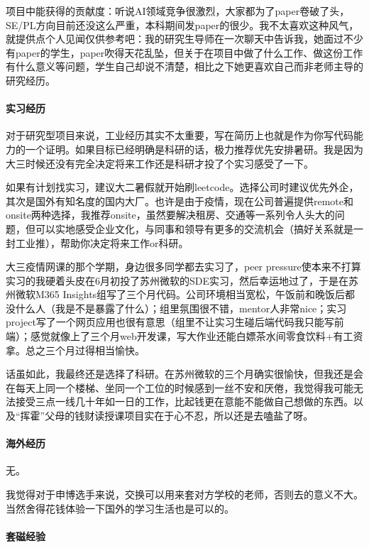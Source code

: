 项目中能获得的贡献度：听说AI领域竞争很激烈，大家都为了paper卷破了头，SE/PL方向目前还没这么严重，本科期间发paper的很少。我不太喜欢这种风气，就提供点个人见闻仅供参考吧：我的研究生导师在一次聊天中告诉我，她面过不少有paper的学生，paper吹得天花乱坠，但关于在项目中做了什么工作、做这份工作有什么意义等问题，学生自己却说不清楚，相比之下她更喜欢自己而非老师主导的研究经历。

\paragraph{实习经历}

对于研究型项目来说，工业经历其实不太重要，写在简历上也就是作为你写代码能力的一个证明。如果目标已经明确是科研的话，极力推荐优先安排暑研。我是因为大三时候还没有完全决定将来工作还是科研才投了个实习感受了一下。

如果有计划找实习，建议大二暑假就开始刷leetcode。选择公司时建议优先外企，其次是国外有知名度的国内大厂。也许是由于疫情，现在公司普遍提供remote和onsite两种选择，我推荐onsite，虽然要解决租房、交通等一系列令人头大的问题，但可以实地感受企业文化，与同事和领导有更多的交流机会（搞好关系就是一封工业推），帮助你决定将来工作or科研。

大三疫情网课的那个学期，身边很多同学都去实习了，peer pressure使本来不打算实习的我硬着头皮在6月初投了苏州微软的SDE实习，然后幸运地过了，于是在苏州微软M365 Insights组写了三个月代码。公司环境相当宽松，午饭前和晚饭后都没什么人（我是不是暴露了什么）；组里氛围很不错，mentor人非常nice；实习project写了一个网页应用也很有意思（组里不让实习生碰后端代码我只能写前端）；感觉就像上了三个月web开发课，写大作业还能白嫖茶水间零食饮料+有工资拿。总之三个月过得相当愉快。

话虽如此，我最终还是选择了科研。在苏州微软的三个月确实很愉快，但我还是会在每天上同一个楼梯、坐同一个工位的时候感到一丝不安和厌倦，我觉得我可能无法接受三点一线几十年如一日的工作，比起钱更在意能不能做自己想做的东西。以及“挥霍”父母的钱财读授课项目实在于心不忍，所以还是去嗑盐了呀。


\paragraph{海外经历}
无。

我觉得对于申博选手来说，交换可以用来套对方学校的老师，否则去的意义不大。当然舍得花钱体验一下国外的学习生活也是可以的。

\paragraph{套磁经验}


